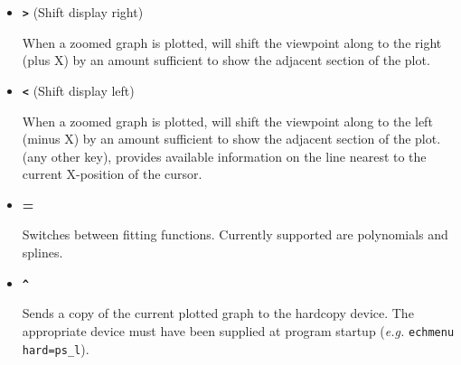 \documentclass[11pt,twoside]{article}
\newcommand{\sunspec}[2]{#1}
\renewcommand{\sunspec}[2]{#2}
\newcommand{\myindex}[1]{\index{#1}}
\renewcommand{\myindex}[1]{}
\begin{document}
\begin{itemize}
\begin{itemize}
      \item {\sunspec{\Large}{\bf} \texttt{>}} (Shift display right)

            When a zoomed graph is
            plotted, will shift the viewpoint along to the right (plus X)
            by an amount sufficient to show the adjacent section of the
            plot.

      \item {\sunspec{\Large}{\bf} \texttt{<}} (Shift display left)

            When a zoomed graph is plotted,
            will shift the viewpoint along to the left (minus X) by an
            amount sufficient to show the adjacent section of the plot.
            (any other key), provides available information on the line
            nearest to the current X-position of the cursor.

      \item {\sunspec{\Large\tt}{\bf} =}

            Switches between fitting functions.
            Currently supported are polynomials and splines.

      \item {\sunspec{\Large\tt}{\bf} \verb+^+}
            \myindex{Arc fitting!hardcopies}

            Sends a copy of the current plotted graph to the hardcopy device.
            The appropriate device must have been supplied at program startup
            ({\it{e.g.}} \verb+echmenu hard=ps_l+).

      \end{itemize}

\end{itemize}
\end{document}
